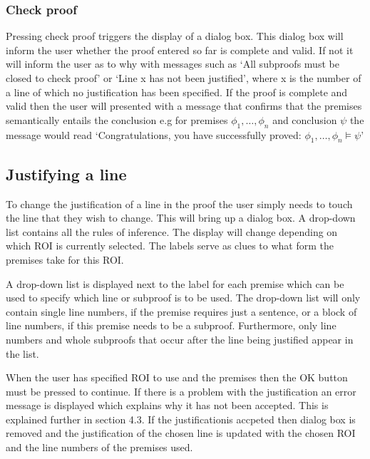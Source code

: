 \subsubsection*{Check proof}

Pressing check proof triggers the display of a dialog box. This dialog box will inform the user whether the proof entered so far is complete and valid. If not it will inform the user as to why with messages such as `All subproofs must be closed to check proof' or `Line x has not been justified', where x is the number of a line of which no justification has been specified. If the proof is complete and valid then the user will presented with a message that confirms that the premises semantically entails the conclusion e.g for premises $\phi_1, \hdots , \phi_n$ and conclusion $\psi$ the message would read `Congratulations,  you have successfully proved: $\phi_1, \hdots , \phi_n \models \psi$'                                                                                                                                                                                  


\subsection{Justifying a line}

To change the justification of a line in the proof the user simply needs to touch the line that they wish to change. This will bring up a dialog box. A drop-down list contains all the rules of inference. The display will change depending on which ROI is currently selected. The labels serve as clues to what form the premises take for this ROI. 

A drop-down list is displayed next to the label for each premise which can be used to specify which line or subproof is to be used.  The drop-down list will only contain single line numbers, if the premise requires just a sentence, or a block of line numbers, if this premise needs to be a subproof. Furthermore, only line numbers and whole subproofs that occur after the line being justified appear in the list. 

When the user has specified ROI to use and the premises then the OK button must be pressed to continue. If there is a problem with the justification an error message is displayed which explains why it has not been accepted. This is explained further in section 4.3. If the justificationis accpeted then dialog box is removed and the justification of the chosen line is updated with the chosen ROI and the line numbers of the premises used.

